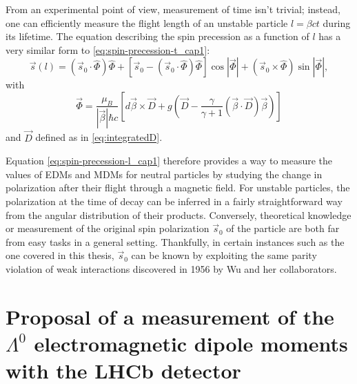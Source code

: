 From an experimental point of view, measurement of time isn't trivial;
instead, one can efficiently measure the flight length of an unstable particle $l=\beta c t$ during its lifetime.
The equation describing the spin precession as a function of $l$ has a very similar form to \eqref{eq:spin-precession-t_cap1}:
\begin{equation}
	\vec{s} \left(
		l
	\right) =
	\left(
		\vec{s}_0 \cdot \hat{\Phi}
	\right) \hat{\Phi}
	+
	\left[
		\vec{s}_0 - \left(
			\vec{s}_0 \cdot \hat{\Phi}
		\right) \hat{\Phi}
	\right]
	\cos \left \lvert
		\vec{\Phi}
	\right\rvert
	+
	\left(
		\vec{s}_0 \times \hat{\Phi}
	\right)
	\sin \left \lvert
		\vec{\Phi}
	\right \rvert,
\label{eq:spin-precession-l_cap1}
\end{equation}
with
\begin{equation}
\vec{\Phi} = \frac{\mu_B}{|\vec{\beta}|\hbar c}
\left[
	d\vec{\beta} \times \vec{D}
	+
	g\left(
	\vec{D} - \frac{\gamma}{\gamma+1}(\vec{\beta} \cdot \vec{D}) \vec{\beta}
	\right)
\right]
\end{equation}
and $\vec{D}$ defined as in \eqref{eq:integratedD}.

Equation \eqref{eq:spin-precession-l_cap1} therefore provides a way to measure the values of EDMs and MDMs for neutral particles by studying the change in polarization after their flight through a magnetic field.
For unstable particles, the polarization at the time of decay can be inferred in a fairly straightforward way from the angular distribution of their products.
Conversely, theoretical knowledge or measurement of the original spin polarization $\vec{s}_0$ of the particle are both far from easy tasks in a general setting.
Thankfully, in certain instances such as the one covered in this thesis, $\vec{s}_0$ can be known by exploiting the same parity violation of weak interactions discovered in 1956 by Wu and her collaborators.

\section{Proposal of a measurement of the \texorpdfstring{$\Lambda^0$}{Lambda} electromagnetic dipole moments with the LHCb detector}
\label{sec:lambda}

